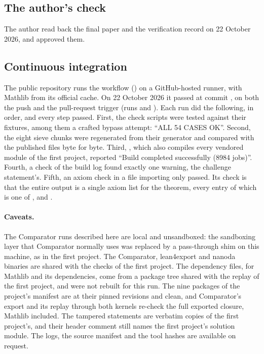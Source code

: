 \documentclass[11pt]{article}
\theoremstyle{definition}
\begin{document}
\subsection{The author's check}\label{sec:authorcheck}

The author read back the final paper and the verification record on 22 October 2026, and approved them.

\subsection{Continuous integration}\label{sec:ci}

The public repository runs the workflow  () on a GitHub-hosted  runner, with Mathlib from its official cache. On 22 October 2026 it passed at commit , on both the push and the pull-request trigger (runs  and ). Each run did the following, in order, and every step passed. First, the check scripts were tested against their fixtures, among them a crafted bypass attempt: ``ALL 54 CASES OK''. Second, the eight sieve chunks were regenerated from their generator and compared with the published files byte for byte. Third, , which also compiles every vendored module of the first project, reported ``Build completed successfully (8984 jobs)''. Fourth, a check of the build log found exactly one  warning, the challenge statement's. Fifth, an axiom check in a file importing only  passed. Its check is that the entire output is a single axiom list for the theorem, every entry of which is one of ,  and .

\paragraph{Caveats.} The Comparator runs described here are local and unsandboxed: the sandboxing layer that Comparator normally uses was replaced by a pass-through  shim on this machine, as in the first project. The Comparator, lean4export and nanoda binaries are shared with the checks of the first project. The dependency  files, for Mathlib  and its dependencies, come from a package tree shared with the replay of the first project, and were not rebuilt for this run. The nine packages of the project's manifest are at their pinned revisions and clean, and Comparator's export and its replay through both kernels re-check the full exported closure, Mathlib included. The tampered statements are verbatim copies of the first project's, and their header comment still names the first project's solution module. The logs, the source manifest and the tool hashes are available on request.
\end{document}
